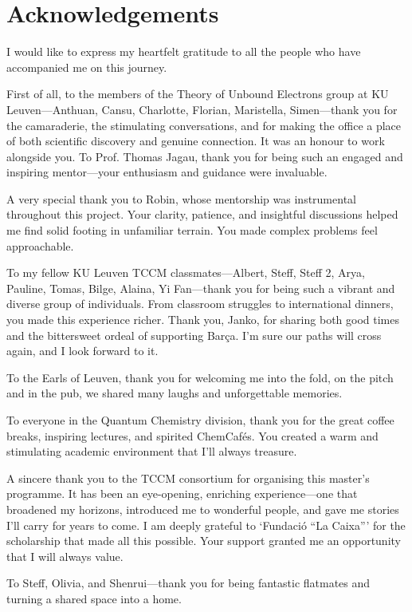 \chapter*{Acknowledgements}
I would like to express my heartfelt gratitude to all the people who have accompanied me on this journey.

First of all, to the members of the Theory of Unbound Electrons group at KU Leuven—Anthuan, Cansu, Charlotte, Florian, Maristella, Simen—thank you for the camaraderie, the stimulating conversations, and for making the office a place of both scientific discovery and genuine connection. It was an honour to work alongside you. To Prof. Thomas Jagau, thank you for being such an engaged and inspiring mentor—your enthusiasm and guidance were invaluable.

A very special thank you to Robin, whose mentorship was instrumental throughout this project. Your clarity, patience, and insightful discussions helped me find solid footing in unfamiliar terrain. You made complex problems feel approachable.

To my fellow KU Leuven TCCM classmates—Albert, Steff, Steff 2, Arya, Pauline, Tomas, Bilge, Alaina, Yi Fan—thank you for being such a vibrant and diverse group of individuals. From classroom struggles to international dinners, you made this experience richer. Thank you, Janko, for sharing both good times and the bittersweet ordeal of supporting Bar\c{c}a. I'm sure our paths will cross again, and I look forward to it. 

To the Earls of Leuven, thank you for welcoming me into the fold, on the pitch and in the pub, we shared many laughs and unforgettable memories.

To everyone in the Quantum Chemistry division, thank you for the great coffee breaks, inspiring lectures, and spirited ChemCafés. You created a warm and stimulating academic environment that I'll always treasure.

A sincere thank you to the TCCM consortium for organising this master's programme. It has been an eye-opening, enriching experience—one that broadened my horizons, introduced me to wonderful people, and gave me stories I'll carry for years to come. I am deeply grateful to `Fundaci{\'o} ``La Caixa''' for the scholarship that made all this possible. Your support granted me an opportunity that I will always value.

To Steff, Olivia, and Shenrui—thank you for being fantastic flatmates and turning a shared space into a home.


